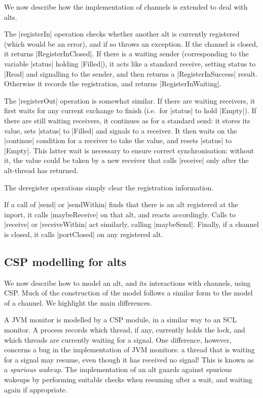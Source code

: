We now describe how the implementation of channels is extended to deal with
alts.

The |registerIn| operation checks whether another alt is currently registered
(which would be an error), and if so throws an exception.  If the channel is
closed, it returns |RegisterInClosed|.  If there is a waiting sender
(corresponding to the variable |status| holding |Filled|), it acts like a
standard receive, setting status to |Read| and signalling to the sender, and
then returns a |RegisterInSuccess| result.  Otherwise it records the
registration, and returns |RegisterInWaiting|.  

The |registerOut| operation is somewhat similar.  If there are waiting
receivers, it first waits for any current exchange to finish (i.e.~for
|status| to hold |Empty|).  If there are still waiting receivers, it continues
as for a standard send: it stores its value, sets |status| to |Filled| and
signals to a receiver.  It then waits on the |continue| condition for a
receiver to take the value, and resets |status| to |Empty|.  This latter wait
is necessary to ensure correct synchronisation: without it, the value could be
taken by a new receiver that calls |receive| only after the alt-thread has
returned.  

The deregister operations simply clear the registration information.

If a call of |send| or |sendWithin| finds that there is an alt registered at
the inport, it calls |maybeReceive| on that alt, and reacts accordingly.
Calls to |receive| or |receiveWithin| act similarly, calling |maybeSend|.  
%
Finally, if a channel is closed, it calls |portClosed| on any registered alt. 


\subsection{CSP modelling for alts}

\inlineCSP

We now describe how to model an alt, and its interactions with channels, using
CSP\@.  Much of the construction of the model follows a similar form to the
model of a channel.  We highlight the main differences. 

A JVM monitor is modelled by a CSP module, in a similar way to an SCL monitor.
A process records which thread, if any, currently holds the lock, and which
threads are currently waiting for a signal.  One difference, however, concerns
a bug in the implementation of JVM monitors: a thread that is waiting for a
signal may resume, even though it has received no signal!  This is known as a
\emph{spurious wakeup}.  The implementation of an alt guards against spurious
wakeups by performing suitable checks when resuming after a wait, and waiting
again if appropriate.

